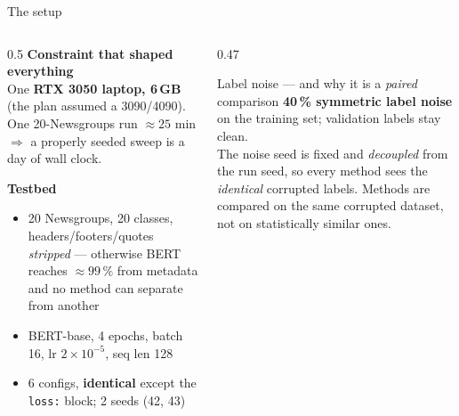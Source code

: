 \begin{frame}{The setup}
  \small
  \begin{columns}[T]
    \begin{column}{0.5\textwidth}
      \textbf{Constraint that shaped everything}\\
      One \textbf{RTX 3050 laptop, 6\,GB} (the plan assumed a 3090/4090).
      One 20-Newsgroups run $\approx 25$ min $\Rightarrow$ a properly seeded
      sweep is a day of wall clock.
      \vspace{0.5em}

      \textbf{Testbed}
      \begin{itemize}\setlength\itemsep{0.1em}
        \item 20 Newsgroups, 20 classes, headers/footers/quotes \emph{stripped}
              --- otherwise BERT reaches $\approx99\,\%$ from metadata and no
              method can separate from another
        \item BERT-base, 4 epochs, batch 16, lr $2\!\times\!10^{-5}$, seq len 128
        \item 6 configs, \textbf{identical} except the \texttt{loss:} block; 2 seeds (42, 43)
      \end{itemize}
    \end{column}
    \begin{column}{0.47\textwidth}
      \begin{block}{Label noise --- and why it is a \emph{paired} comparison}
        \textbf{40\,\% symmetric label noise} on the training set; validation
        labels stay clean.\\[0.3em]
        The noise seed is fixed and \emph{decoupled} from the run seed, so every
        method sees the \emph{identical} corrupted labels. Methods are compared
        on the same corrupted dataset, not on statistically similar ones.
      \end{block}
    \end{column}
  \end{columns}
\end{frame}
